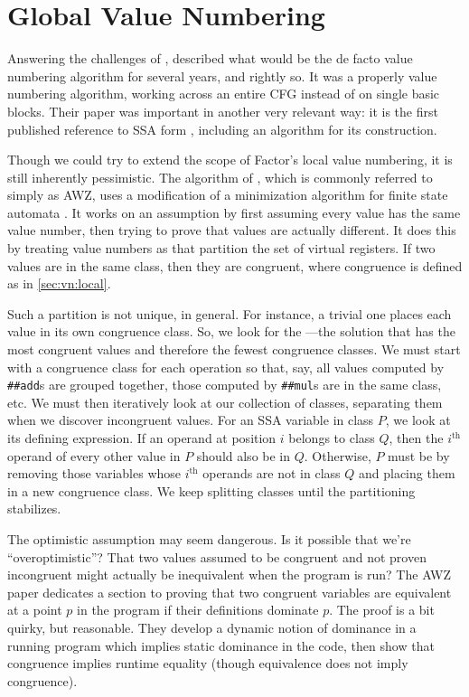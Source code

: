 \section{Global Value Numbering}\label{sec:vn:global}

Answering the challenges of \citeauthor{Cocke}, \citeauthor{AWZ}
\autocite*{AWZ} described what would be the de facto value numbering algorithm
for several years, and rightly so.  It was a properly  value
numbering algorithm, working across an entire \gls{CFG} instead of on single
basic blocks.  Their paper was important in another very relevant way: it is
the first published reference to SSA form \autocite{VanDrunen}, including an
algorithm for its construction.

Though we could try to extend the scope of Factor's local value numbering, it
is still inherently pessimistic.  The algorithm of \citeauthor{AWZ}, which is
commonly referred to simply as AWZ, uses a modification of a minimization
algorithm for finite state automata \autocite{Hopcroft}.  It works on an
 assumption by first assuming every value has the same value
number, then trying to prove that values are actually different.  It does this
by treating value numbers as  that partition the set
of virtual registers.  If two values are in the same class, then they are
congruent, where congruence is defined as in \cref{sec:vn:local}.

Such a partition is not unique, in general.  For instance, a trivial one places
each value in its own congruence class.  So, we look for the ---the solution that has the most congruent values and therefore
the fewest congruence classes.  We must start with a congruence class for each
operation so that, say, all values computed by \Verb|##add|s are grouped
together, those computed by \Verb|##mul|s are in the same class, etc.  We
must then iteratively look at our collection of classes, separating them when
we discover incongruent values.  For an \gls{SSA} variable in class $P$, we
look at its defining expression.  If an operand at position $i$ belongs to
class $Q$, then the $i^\text{th}$ operand of every other value in $P$ should
also be in $Q$.  Otherwise, $P$ must be  by removing those
variables whose $i^\text{th}$ operands are not in class $Q$ and placing them in
a new congruence class.  We keep splitting classes until the partitioning
stabilizes.

The optimistic assumption may seem dangerous.  Is it possible that we're
``overoptimistic''?  That two values assumed to be congruent and not proven
incongruent might actually be inequivalent when the program is run?  The AWZ
paper dedicates a section to proving that two congruent variables are
equivalent at a point $p$ in the program if their definitions dominate $p$.
The proof is a bit quirky, but reasonable.  They develop a dynamic notion of
dominance in a running program which implies static dominance in the code, then
show that congruence implies runtime equality (though equivalence does not
imply congruence).

